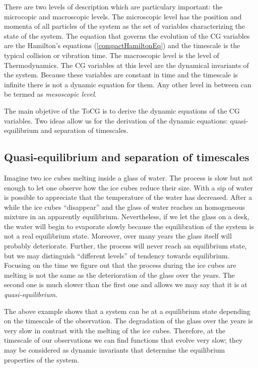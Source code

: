 \documentclass[b5paper,openright,10pt]{book}
\begin{document}
There are two levels of description which are particulary important: the microcopic and macroscopic levels.
The microscopic level has the position and momenta of all particles of the system as the set of variables characterizing the state of the system. 
The equation that governs the evolution of the CG variables are the Hamilton's equations (\ref{compactHamiltonEq}) and the timescale is the typical collision or vibration time. 
The macroscopic level is the level of Thermodynamics. The CG variables at this level are the dynamical invariants of the system. Because these variables are constant in time and the timescale is infinite there is not a dynamic equation for them.  %
Any other level in between can be termed as {\it mesoscopic level}. 

The main objetive of the ToCG is to derive the dynamic equations of the CG variables. Two ideas allow us for the derivation of the dynamic equations: quasi-equilibrium and separation of timescales.

\subsection{Quasi-equilibrium and separation of timescales}
Imagine two ice cubes melting inside a glass of water. 
The process is slow but not enough to let one observe how the ice cubes reduce their size. 
With a sip of water is possible to appreciate that the temperature of the water has decreased. 
After a while the ice cubes ``disappear'' and the glass of water reaches an homogeneous mixture in an apparently equilibrium. 
Nevertheless, if we let the glass on a desk, the water will begin to evaporate slowly because the equilibration of the system is not a real equilibrium state. 
Moreover, over many years the glass itself will probably deteriorate. 
Further, the process will never reach an equilibrium state, but we may distinguish ``different levels'' of tendency towards equilibrium.  
Focusing on the time we figure out that the process during the ice cubes are melting is not the same as the deterioration of the glass over the years.
The second one is much slower than the first one and allows we may say that it is at {\it quasi-equilibrium}.

The above example shows that a system can be at a equilibrium state depending on the timescale of the observation. The degradation of the glass over the years is very slow in contrast with the melting of the ice cubes. Therefore, at the timescale of our observations we can find functions that evolve very slow; they may be considered as dynamic invariants that determine the equilibrium properties of the system. 
\end{document}
